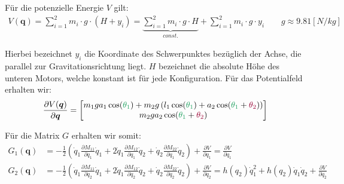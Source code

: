 \documentclass[a4paper, 12pt]{scrartcl}
\newcommand{\gruen}[2][cadGreen]{\textcolor{#1}{#2}}
\newcommand{\dunkelrot}[2][dunkelrot]{\textcolor{#1}{#2}}
\begin{document}
Für die potenzielle Energie $V$ gilt:
\begin{align*}
    V(\bm{q}) = \sum_{i=1}^{2} m_i \cdot g \cdot (H + y_i) = 
    \underbrace{
        \sum_{i=1}^{2} m_i \cdot g \cdot H
    }_{const.}
    + \sum_{i=1}^{2} m_i \cdot g \cdot y_i
    \qquad
    g \approx 9.81 [N/kg]
\end{align*}

Hierbei bezeichnet $y_i$ die Koordinate des Schwerpunktes bezüglich der Achse, die parallel zur 
Gravitationsrichtung liegt. $H$ bezeichnet die absolute Höhe des unteren Motors, welche konstant 
ist für jede Konfiguration. Für das Potentialfeld erhalten wir:
\begin{align*}
    \frac{\partial V(\bm{q})}{\partial \bm{q}}
    =
    \begin{bmatrix}
        m_1  g  a_1 \cos(\gruen{\theta_1}) + m_2  g \left( l_1 \cos(\gruen{\theta_1}) 
        + a_2 \cos(\gruen{\theta_1} + \dunkelrot{\theta_2}) \right) 
        \\
        m_2  g  a_2 
        \cos(\gruen{\theta_1} + \dunkelrot{\theta_2}) 
    \end{bmatrix}
\end{align*}

Für die Matrix $G$ erhalten wir somit:
\begin{align*}
    G_1(\bm{q})
    &=
    -\frac{1}{2} 
    \left(
        \dot{q}_1 \frac{\partial M_{11}}{\partial q_1} \dot{q}_1
        +
        2 \dot{q}_1 \frac{\partial M_{12}}{\partial q_1} \dot{q}_2
        +
        \dot{q}_2 \frac{\partial M_{22}}{\partial q_1} \dot{q}_2
    \right)
    + 
    \frac{\partial V}{\partial q_1}
    =
    \frac{\partial V}{\partial q_1}
    \\
    G_2(\bm{q})
    &=
    -\frac{1}{2} 
    \left(
        \dot{q}_1 \frac{\partial M_{11}}{\partial q_2} \dot{q}_1
        +
        2\dot{q}_1 \frac{\partial M_{12}}{\partial q_2} \dot{q}_2
        +
        \dot{q}_2 \frac{\partial M_{22}}{\partial q_2} \dot{q}_2
    \right)
    + 
    \frac{\partial V}{\partial q_2}
    =
    h(q_2) \dot{q}_1^2 + h(q_2) \dot{q}_1 \dot{q}_2 + \frac{\partial V}{\partial q_2}
\end{align*}
\end{document}
